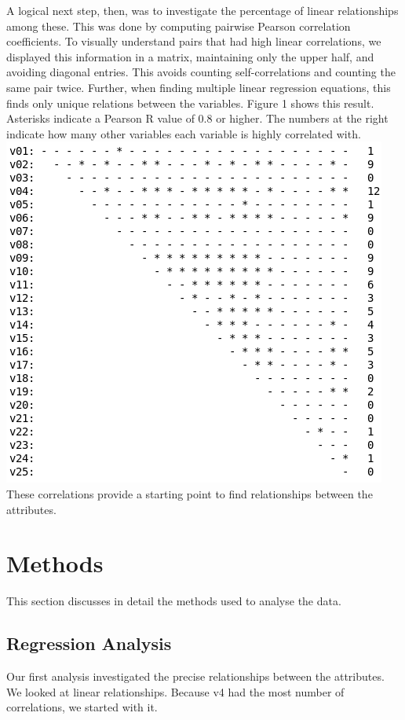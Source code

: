 \documentclass[12pt,a4paper,twocolumn]{article}
\begin{document}
A logical next step, then, was to investigate the percentage of linear relationships among these. This was done by computing pairwise Pearson correlation coefficients. To visually understand pairs that had high linear correlations, we displayed this information in a matrix, maintaining only the upper half, and avoiding diagonal entries. This avoids counting self-correlations and counting the same pair twice. Further, when finding multiple linear regression equations, this finds only unique relations between the variables. Figure 1 shows this result. Asterisks indicate a Pearson R value of 0.8 or higher. The numbers at the right indicate how many other variables each variable is highly correlated with. \\

\includegraphics[scale=0.4]{fig1.png}
\begingroup
{}
\endgroup
\hfill\break
These correlations provide a starting point to find relationships between the attributes.

\section{Methods}
This section discusses in detail the methods used to analyse the data.

\subsection{Regression Analysis}
Our first analysis investigated the precise relationships between the attributes. We looked at linear relationships. Because v4 had the most number of correlations, we started with it.
\end{document}
